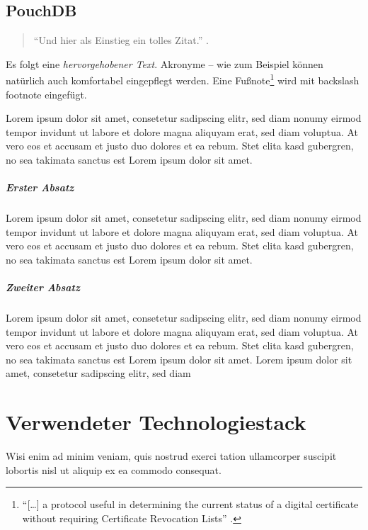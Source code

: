 \section{PouchDB}
\label{sec:Szenarien}
\begin{citeenv}
  \begin{quotation}
    "`Und hier als Einstieg ein tolles Zitat."' \cite{book:eckert}.
  \end{quotation}
\end{citeenv}

Es folgt eine \emph{hervorgehobener Text}. Akronyme -- wie zum Beispiel  können natürlich auch komfortabel eingepflegt werden. Eine Fußnote\footnote{"`[\ldots] a protocol useful in determining the current status of a digital certificate without requiring Certificate Revocation Lists"' \cite{tech:rfc6960}.} wird mit backslash footnote eingefügt.

Lorem ipsum dolor sit amet, consetetur sadipscing elitr, sed diam nonumy eirmod tempor invidunt ut labore et dolore magna aliquyam erat, sed diam voluptua. At vero eos et accusam et justo duo dolores et ea rebum. Stet clita kasd gubergren, no sea takimata sanctus est Lorem ipsum dolor sit amet.

\paragraph{Erster Absatz}
\label{par:Usecase 1}
Lorem ipsum dolor sit amet, consetetur sadipscing elitr, sed diam nonumy eirmod tempor invidunt ut labore et dolore magna aliquyam erat, sed diam voluptua. At vero eos et accusam et justo duo dolores et ea rebum. Stet clita kasd gubergren, no sea takimata sanctus est Lorem ipsum dolor sit amet.

\paragraph{Zweiter Absatz}
\label{par:Usecase 2}
Lorem ipsum dolor sit amet, consetetur sadipscing elitr, sed diam nonumy eirmod tempor invidunt ut labore et dolore magna aliquyam erat, sed diam voluptua. At vero eos et accusam et justo duo dolores et ea rebum. Stet clita kasd gubergren, no sea takimata sanctus est Lorem ipsum dolor sit amet. Lorem ipsum dolor sit amet, consetetur sadipscing elitr, sed diam

\chapter{Verwendeter Technologiestack}
\label{chap:Technologien}
Wisi enim ad minim veniam, quis nostrud exerci tation ullamcorper suscipit lobortis nisl ut aliquip ex ea commodo consequat.

